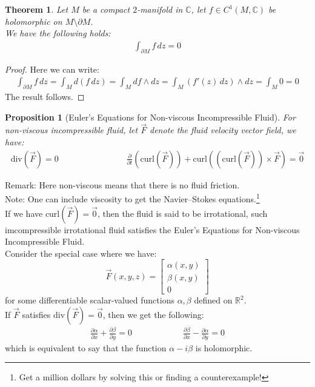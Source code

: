 \documentclass[15pt]{book}
\theoremstyle{break}
\theoremstyle{break}
\newtheorem{thm}{Theorem}[section]
\newtheorem{prop}[lem]{Proposition}
\newcommand{\R}{\mathbb{R}}
\newcommand{\Complex}{\mathbb{C}}
\newcommand{\bmat}[1]{\begin{bmatrix} #1 \end{bmatrix}}
\newcommand{\note}{\color{red}Note: \color{black}}
\newcommand{\remark}{\color{blue}Remark: \color{black}}
\begin{document}
\hfill\break
\begin{thm}
Let $M$ be a compact $2$-manifold in $\Complex$, let $f \in C^1(M, \Complex)$ be holomorphic on $M \setminus \partial M$. \\
We have the following holds:
\begin{align*}
\int_{\partial M}f\, dz = 0
\end{align*}
\end{thm}
\begin{proof}
Here we can write:
\begin{align*}
\int_{\partial M}f\, dz = \int_M d(f\, dz) = \int_M df\wedge dz = \int_{M}(f'(z)\, dz) \wedge dz = \int_{M} 0 =0
\end{align*}
The result follows.
\end{proof}


\newpage
\begin{prop}[Euler's Equations for Non-viscous Incompressible Fluid]
For non-viscous incompressible fluid, let $\vec{F}$ denote the fluid velocity vector field, we have:
\begin{align*} 
\text{div}(\vec{F}) = 0 \qquad\qquad\qquad\qquad
\frac{\partial }{\partial t}\left(\text{curl}(\vec{F})\right) + \text{curl}\left(\left(\text{curl}(\vec{F})\right)\times \vec{F}\right) = \vec{0}
\end{align*}
\end{prop}
\remark Here non-viscous means that there is no fluid friction.\\
\note One can include viscosity to get the Navier–Stokes equations.\footnote{Get a million dollars by solving this or finding a counterexample!} \\

If we have $\text{curl}(\vec{F}) = \vec{0}$, then the fluid is said to be irrotational, such imcompressible irrotational fluid satisfies the Euler's Equations for Non-viscous Incompressible Fluid.\\

Consider the special case where we have: 
$$\vec{F}(x,y,z) = \bmat{\alpha(x,y)\\ \beta(x,y) \\ 0}$$ 
for some differentiable scalar-valued functions $\alpha,\beta$ defined on $\R^2$. \\If $\vec{F}$ satisfies $\text{div}(\vec{F}) = \vec{0}$, then we get the following:
\begin{align*}
\frac{\partial \alpha}{\partial x} + \frac{\partial \beta}{\partial y} = 0 \qquad\qquad\qquad
\frac{\partial \beta}{\partial x} - \frac{\partial \alpha}{\partial y} = 0
\end{align*} 
which is equivalent to say that the function $\alpha - i\beta$ is holomorphic. \\
\end{document}
